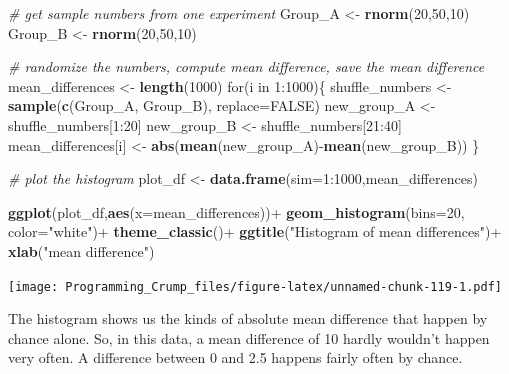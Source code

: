\documentclass[]{book}
\newenvironment{Shaded}{\begin{snugshade}}{\end{snugshade}}
\newcommand{\KeywordTok}[1]{\textcolor[rgb]{0.13,0.29,0.53}{\textbf{{#1}}}}
\newcommand{\DataTypeTok}[1]{\textcolor[rgb]{0.13,0.29,0.53}{{#1}}}
\newcommand{\DecValTok}[1]{\textcolor[rgb]{0.00,0.00,0.81}{{#1}}}
\newcommand{\StringTok}[1]{\textcolor[rgb]{0.31,0.60,0.02}{{#1}}}
\newcommand{\CommentTok}[1]{\textcolor[rgb]{0.56,0.35,0.01}{\textit{{#1}}}}
\newcommand{\OtherTok}[1]{\textcolor[rgb]{0.56,0.35,0.01}{{#1}}}
\newcommand{\NormalTok}[1]{{#1}}
\theoremstyle{definition}
\theoremstyle{definition}
\theoremstyle{definition}
\theoremstyle{remark}
\begin{document}
\begin{Shaded}
\begin{Highlighting}[]
\CommentTok{# get sample numbers from one experiment}
\NormalTok{Group_A <-}\StringTok{ }\KeywordTok{rnorm}\NormalTok{(}\DecValTok{20}\NormalTok{,}\DecValTok{50}\NormalTok{,}\DecValTok{10}\NormalTok{)}
\NormalTok{Group_B <-}\StringTok{ }\KeywordTok{rnorm}\NormalTok{(}\DecValTok{20}\NormalTok{,}\DecValTok{50}\NormalTok{,}\DecValTok{10}\NormalTok{)}

\CommentTok{# randomize the numbers, compute mean difference, save the mean difference}
\NormalTok{mean_differences <-}\StringTok{ }\KeywordTok{length}\NormalTok{(}\DecValTok{1000}\NormalTok{)}
\NormalTok{for(i in }\DecValTok{1}\NormalTok{:}\DecValTok{1000}\NormalTok{)\{}
  \NormalTok{shuffle_numbers <-}\StringTok{ }\KeywordTok{sample}\NormalTok{(}\KeywordTok{c}\NormalTok{(Group_A, Group_B), }\DataTypeTok{replace=}\OtherTok{FALSE}\NormalTok{)}
  \NormalTok{new_group_A <-}\StringTok{ }\NormalTok{shuffle_numbers[}\DecValTok{1}\NormalTok{:}\DecValTok{20}\NormalTok{]}
  \NormalTok{new_group_B <-}\StringTok{ }\NormalTok{shuffle_numbers[}\DecValTok{21}\NormalTok{:}\DecValTok{40}\NormalTok{]}
  \NormalTok{mean_differences[i] <-}\StringTok{ }\KeywordTok{abs}\NormalTok{(}\KeywordTok{mean}\NormalTok{(new_group_A)-}\KeywordTok{mean}\NormalTok{(new_group_B))}
\NormalTok{\}}

\CommentTok{# plot the histogram}
\NormalTok{plot_df <-}\StringTok{ }\KeywordTok{data.frame}\NormalTok{(}\DataTypeTok{sim=}\DecValTok{1}\NormalTok{:}\DecValTok{1000}\NormalTok{,mean_differences)}

\KeywordTok{ggplot}\NormalTok{(plot_df,}\KeywordTok{aes}\NormalTok{(}\DataTypeTok{x=}\NormalTok{mean_differences))+}
\StringTok{  }\KeywordTok{geom_histogram}\NormalTok{(}\DataTypeTok{bins=}\DecValTok{20}\NormalTok{, }\DataTypeTok{color=}\StringTok{"white"}\NormalTok{)+}
\StringTok{  }\KeywordTok{theme_classic}\NormalTok{()+}
\StringTok{  }\KeywordTok{ggtitle}\NormalTok{(}\StringTok{"Histogram of mean differences"}\NormalTok{)+}
\StringTok{  }\KeywordTok{xlab}\NormalTok{(}\StringTok{"mean difference"}\NormalTok{)}
\end{Highlighting}
\end{Shaded}

\texttt{[image: Programming\_Crump\_files/figure-latex/unnamed-chunk-119-1.pdf]}

The histogram shows us the kinds of absolute mean difference that happen
by chance alone. So, in this data, a mean difference of 10 hardly
wouldn't happen very often. A difference between 0 and 2.5 happens
fairly often by chance.
\end{document}
